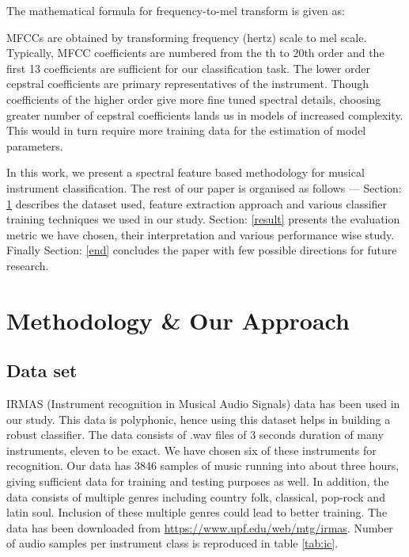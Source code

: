 \documentclass[conference]{IEEEtran}
\begin{document}
The mathematical formula for frequency-to-mel transform is given as: 


MFCCs are obtained by transforming frequency (hertz) scale to mel scale. Typically, MFCC coefficients are numbered from the th to 20th order and the first 13 coefficients are sufficient for our classification task. The lower order cepstral coefficients are primary representatives of the instrument. Though coefficients of the higher order give more fine tuned spectral details, choosing greater number of cepstral coefficients lands us in models of increased complexity. This would in turn require more training data for the estimation of model parameters.

In this work, we present a spectral feature based methodology for musical instrument classification. The rest of our paper is organised as follows --- Section: \ref{method} describes the dataset used, feature extraction approach and various classifier training techniques we used in our study. Section: \ref{result} presents the evaluation metric we have chosen, their interpretation and various performance wise study.  Finally Section: \ref{end} concludes the paper with few possible directions for future research.

\section{Methodology \& Our Approach}

\label{method}
\subsection{Data set}
IRMAS (Instrument recognition in Musical Audio Signals)\cite{bosch2012comparison} data has been used in our study. This data is polyphonic, hence using this dataset helps in building a robust classifier. The data consists of .wav files of 3 seconds duration of many instruments, eleven to be exact. We have chosen six of these instruments for recognition. Our data has 3846 samples of music running into about three hours, giving sufficient data for training and testing purposes as well. In addition, the data consists of multiple genres including country folk, classical, pop-rock and latin soul. Inclusion of these multiple genres could lead to better training. The data has been downloaded from \url{https://www.upf.edu/web/mtg/irmas}. Number of audio samples per instrument class is reproduced in table \ref{tab:ic}.
\end{document}
